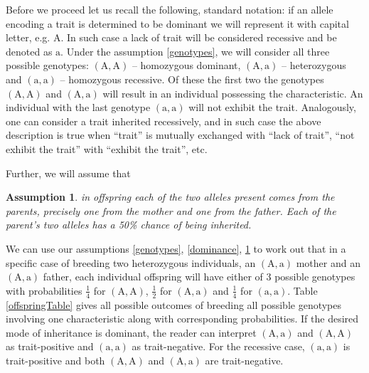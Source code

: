\documentclass{l4proj}
\newtheorem{assum}{Assumption}
\newcommand{\genotype}[2]{\ensuremath{(\mathrm{#1}, \mathrm{#2})}}
\begin{document}
Before we proceed let us recall the following, standard notation: if an \gls{allele} encoding a trait is determined to be \gls{dominant} we will represent it with capital letter, e.g. $\mathrm{A}$. In such case a lack of trait will be considered \gls{recessive} and be denoted as $\mathrm{a}$. Under the assumption \ref{genotypes}, we will consider all three possible genotypes: \genotype{A}{A} -- homozygous dominant, \genotype{A}{a} -- heterozygous and \genotype{a}{a} -- homozygous recessive. Of these the first two the genotypes \genotype{A}{A} and \genotype{A}{a} will result in an individual possessing the characteristic. An individual with the last genotype \genotype{a}{a} will not exhibit the trait. Analogously, one can consider a trait inherited recessively, and in such case the above description is true when ``trait'' is mutually exchanged with ``lack of trait'', ``not exhibit the trait'' with ``exhibit the trait'', etc.

Further, we will assume that
\begin{assum}\label{offspring}
  in offspring each of the two alleles present comes from the parents, precisely one from the mother and one from the father. Each of the parent's two alleles has a 50\% chance of being inherited.
\end{assum}
We can use our assumptions \ref{genotypes}, \ref{dominance}, \ref{offspring} to work out that in a specific case of breeding two heterozygous individuals, an \genotype{A}{a} mother and an \genotype{A}{a} father, each individual offspring will have either of 3 possible genotypes with probabilities $\frac{1}{4}$ for \genotype{A}{A}, $\frac{1}{2}$ for \genotype{A}{a} and $\frac{1}{4}$ for \genotype{a}{a}. Table \ref{offspringTable} gives all possible outcomes of breeding all possible genotypes involving one characteristic along with corresponding probabilities. If the desired mode of inheritance is dominant, the reader can interpret \genotype{A}{a} and \genotype{A}{A} as trait-positive and \genotype{a}{a} as trait-negative. For the recessive case, \genotype{a}{a} is trait-positive and both \genotype{A}{A} and \genotype{A}{a} are trait-negative.
\end{document}
